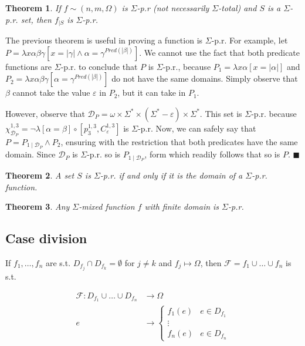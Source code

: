 \documentclass[a4paper, 12pt]{article}
\newtheorem{theorem}{Theorem}
\newtheorem{theorem}{Theorem}
\begin{document}
\begin{theorem}
    If $f \sim (n, m, \Omega)$ is $\Sigma$-p.r (not necessarily $\Sigma$-total) and $S$ is a $\Sigma$-p.r. set,
    then $f_{\mid S}$ is $\Sigma$-p.r. 
\end{theorem}

The previous theorem is useful in proving a function is $\Sigma$-p.r. For
example, let $P = \lambda x\alpha\beta \gamma \left[  x = |\gamma| \land \alpha
= \gamma^{Pred(|\beta|)}\right] $. We cannot use the fact that both predicate
functions are $\Sigma$-p.r. to conclude that $P$ is $\Sigma$-p.r., because $P_1
= \lambda x\alpha [x = |\alpha|]$ and $P_2 = \lambda x \alpha \beta \gamma
[\alpha =
\gamma^{Pred(|\beta|)}]$ do not have the same domains. Simply observe that
$\beta$ cannot take the value $\varepsilon$ in $P_2$, but it can take in $P_1$.


However, observe that $\mathcal{D}_P = \omega \times \Sigma^{*} \times
(\Sigma^{*} - \varepsilon) \times \Sigma^{*} $. This set is $\Sigma$-p.r. because
$\chi_{\mathcal{D}_P}^{1, 3} = \neg \lambda \left[ \alpha = \beta \right] \circ
\left[ p_{3}^{1, 3}, C_{\varepsilon}^{1, 3} \right]$ is $\Sigma$-p.r. Now, we can
safely say that $P = P_{1\mid \mathcal{D}_P} \land P_2$, ensuring with the
restriction that both predicates have the same domain. Since $\mathcal{D}_P$ is
$\Sigma$-p.r. so is $P_{1\mid \mathcal{D}_P}$, form which readily follows that
so is $P$. $\blacksquare$

\begin{theorem}
    A set $S$ is $\Sigma$-p.r. if and only if it is the domain of a
    $\Sigma$-p.r. function.
\end{theorem}

\begin{theorem}
    Any $\Sigma$-mixed function $f$ with finite domain is $\Sigma$-p.r. 
\end{theorem}

\subsection{Case division}

If $f_1, \ldots, f_n$ are s.t. $D_{f_j} \cap D_{f_k} = \emptyset$ for $j \neq k$
and $f_j \mapsto \Omega$, then $\mathcal{F} = f_1 \cup \ldots \cup f_n$ is s.t. 

\begin{align*}
    \mathcal{F} : D_{f_1} \cup \ldots \cup D_{f_n} &\to \Omega \\
    e &\to \begin{cases}
        f_1(e) & e \in D_{f_1} \\ 
               \vdots \\ 
        f_n(e) & e \in D_{f_n}
    \end{cases}
\end{align*}
\end{document}
